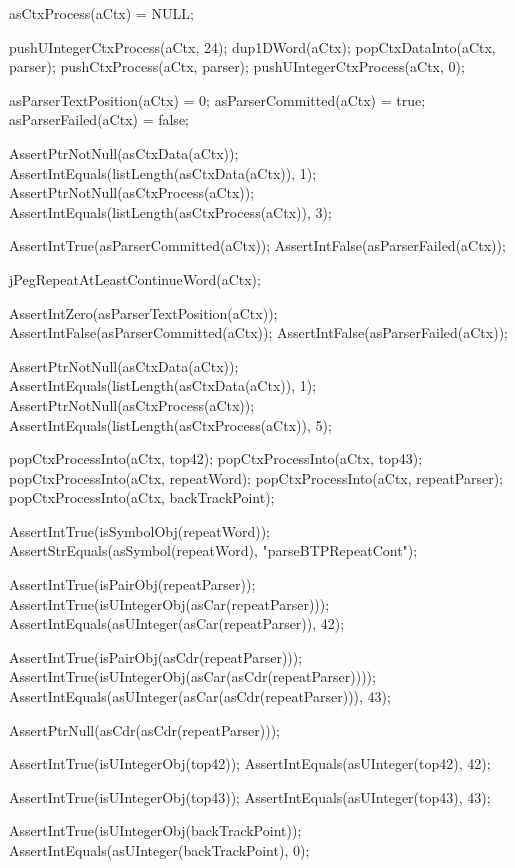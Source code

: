 \startCTest
  asCtxProcess(aCtx) = NULL;
  
  pushUIntegerCtxProcess(aCtx, 24);
  dup1DWord(aCtx);
  popCtxDataInto(aCtx, parser);
  pushCtxProcess(aCtx, parser);
  pushUIntegerCtxProcess(aCtx, 0);
  
  asParserTextPosition(aCtx) = 0;
  asParserCommitted(aCtx)    = true;
  asParserFailed(aCtx)       = false;
  
  AssertPtrNotNull(asCtxData(aCtx));
  AssertIntEquals(listLength(asCtxData(aCtx)), 1);
  AssertPtrNotNull(asCtxProcess(aCtx));
  AssertIntEquals(listLength(asCtxProcess(aCtx)), 3);
  
  AssertIntTrue(asParserCommitted(aCtx));
  AssertIntFalse(asParserFailed(aCtx));
  
  jPegRepeatAtLeastContinueWord(aCtx);
  
  AssertIntZero(asParserTextPosition(aCtx));
  AssertIntFalse(asParserCommitted(aCtx));
  AssertIntFalse(asParserFailed(aCtx));
  
  AssertPtrNotNull(asCtxData(aCtx));
  AssertIntEquals(listLength(asCtxData(aCtx)), 1);
  AssertPtrNotNull(asCtxProcess(aCtx));
  AssertIntEquals(listLength(asCtxProcess(aCtx)), 5);
    
  popCtxProcessInto(aCtx, top42);
  popCtxProcessInto(aCtx, top43);
  popCtxProcessInto(aCtx, repeatWord);
  popCtxProcessInto(aCtx, repeatParser);
  popCtxProcessInto(aCtx, backTrackPoint);
  
  AssertIntTrue(isSymbolObj(repeatWord));
  AssertStrEquals(asSymbol(repeatWord), "parseBTPRepeatCont");
  
  AssertIntTrue(isPairObj(repeatParser));
  AssertIntTrue(isUIntegerObj(asCar(repeatParser)));
  AssertIntEquals(asUInteger(asCar(repeatParser)), 42);
  
  AssertIntTrue(isPairObj(asCdr(repeatParser)));
  AssertIntTrue(isUIntegerObj(asCar(asCdr(repeatParser))));
  AssertIntEquals(asUInteger(asCar(asCdr(repeatParser))), 43);
  
  AssertPtrNull(asCdr(asCdr(repeatParser)));
  
  AssertIntTrue(isUIntegerObj(top42));
  AssertIntEquals(asUInteger(top42), 42);  

  AssertIntTrue(isUIntegerObj(top43));
  AssertIntEquals(asUInteger(top43), 43);
  
  AssertIntTrue(isUIntegerObj(backTrackPoint));
  AssertIntEquals(asUInteger(backTrackPoint), 0);
\stopCTest
\stopTestCase

